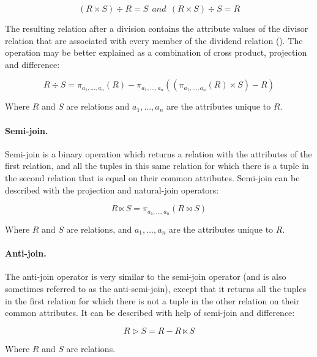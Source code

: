 \begin{equation*}
(R \times S) \div R = S ~~and~~ (R \times S) \div S = R
\end{equation*}

The resulting relation after a division contains the attribute values of the divisor relation that are associated
with every member of the dividend relation (\cite{makeDiv}). The operation may be better explained as a
combination of cross product, projection and difference:

\begin{equation*}
R \div S = \pi _{a_{1},...,a_{n}}(R) - \pi _{a_{1},...,a_{n}}((\pi _{a_{1},...,a_{n}}(R) \times S) - R)
\end{equation*}

Where $R$ and $S$ are relations and $a_{1},...,a_{n}$ are the attributes unique to $R$.

\paragraph{Semi-join.}
Semi-join is a binary operation which returns a relation with the attributes of the first relation, and all the
tuples in this same relation for which there is a tuple in the second relation that is equal on their common
attributes. Semi-join can be described with the projection and natural-join operators:

\begin{equation*}
R \ltimes S = \pi _{a_{1},...,a_{n}}(R \bowtie S)
\end{equation*}

Where $R$ and $S$ are relations, and $a_{1},...,a_{n}$ are the attributes unique to $R$.

\paragraph{Anti-join.}
The anti-join operator is very similar to the semi-join operator (and is also sometimes referred to as the
anti-semi-join), except that it returns all the tuples in the first relation for which there is not a tuple in the
other relation on their common attributes. It can be described with help of semi-join and difference:

\begin{equation*}
R \rhd S = R - R \ltimes S
\end{equation*}

Where $R$ and $S$ are relations.

